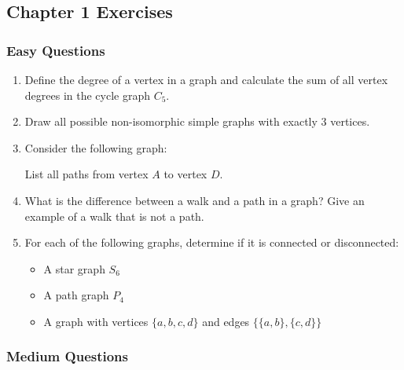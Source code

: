 \documentclass{article}
\theoremstyle{definition}
\begin{document}
\newpage
\subsection{Chapter 1 Exercises}

\subsubsection{Easy Questions}

\begin{enumerate}
\item Define the degree of a vertex in a graph and calculate the sum of all vertex degrees in the cycle graph $C_5$.

\item Draw all possible non-isomorphic simple graphs with exactly 3 vertices.

\item Consider the following graph:
\begin{center}
\end{center}
List all paths from vertex $A$ to vertex $D$.

\item What is the difference between a walk and a path in a graph? Give an example of a walk that is not a path.

\item For each of the following graphs, determine if it is connected or disconnected:
\begin{itemize}
    \item A star graph $S_6$
    \item A path graph $P_4$
    \item A graph with vertices $\{a,b,c,d\}$ and edges $\{\{a,b\}, \{c,d\}\}$
\end{itemize}
\end{enumerate}

\subsubsection{Medium Questions}
\end{document}
